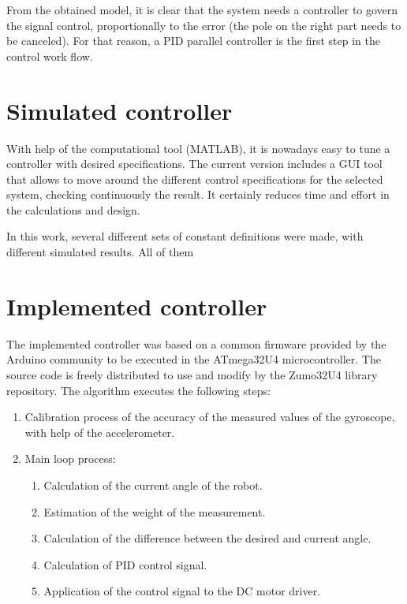 
From the obtained model, it is clear that the system needs a controller to govern the signal control, proportionally to the error (the pole on the right part needs to be canceled). For that reason, a PID parallel controller is the first step in the control work flow.

\section{Simulated controller}

With help of the computational tool (MATLAB), it is nowadays easy to tune a controller with desired specifications. The current version includes a GUI tool that allows to move around the different control specifications for the selected system, checking continuously the result. It certainly reduces time and effort in the calculations and design.

In this work, several different sets of constant definitions were made, with different simulated results. All of them

\section{Implemented controller}

The implemented controller was based on a common firmware provided by the Arduino community to be executed in the ATmega32U4 microcontroller. The source code is freely distributed to use and modify by the Zumo32U4 library repository. The algorithm executes the following steps:

\begin{enumerate}
	\item Calibration process of the accuracy of the measured values of the gyroscope, with help of the accelerometer.
	\item Main loop process:
	\begin{enumerate}
		\item Calculation of the current angle of the robot.
		\item Estimation of the weight of the measurement.
		\item Calculation of the difference between the desired and current angle.
		\item Calculation of PID control signal.
		\item Application of the control signal to the DC motor driver.
	\end{enumerate}
\end{enumerate}

